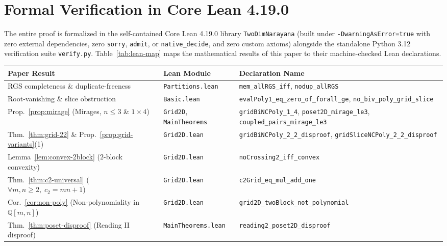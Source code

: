 \documentclass[11pt]{article}
\theoremstyle{plain}
\theoremstyle{definition}
\newcommand{\Q}{\mathbb{Q}}
\begin{document}
\section{Formal Verification in Core Lean 4.19.0}

The entire proof is formalized in the self-contained Core Lean 4.19.0 library \texttt{TwoDimNarayana} (built under \texttt{-DwarningAsError=true} with zero external dependencies, zero \texttt{sorry}, \texttt{admit}, or \texttt{native\_decide}, and zero custom axioms) alongside the standalone Python 3.12 verification suite \texttt{verify.py}. Table~\ref{tab:lean-map} maps the mathematical results of this paper to their machine-checked Lean declarations.

\begin{table}[ht]
\centering
\small
\begin{tabular}{@{}>{\raggedright\arraybackslash}p{}>{\raggedright\arraybackslash}p{}>{\raggedright\arraybackslash}p{}@{}}
\toprule
\textbf{Paper Result} & \textbf{Lean Module} & \textbf{Declaration Name} \\
\midrule
RGS completeness \& duplicate-freeness & \texttt{Partitions.lean} & \texttt{mem\_allRGS\_iff}, \texttt{nodup\_allRGS} \\
Root-vanishing \& slice obstruction & \texttt{Basic.lean} & \texttt{evalPoly1\_eq\_zero\_of\_forall\_ge}, \texttt{no\_biv\_poly\_grid\_slice} \\
Prop.~\ref{prop:mirage} (Mirages, $n \le 3$ \& $1 \times 4$) & \texttt{Grid2D}, \texttt{MainTheorems} & \texttt{gridBiNCPoly\_1\_4}, \texttt{poset2D\_mirage\_le3}, \texttt{coupled\_pairs\_mirage\_le3} \\
Thm.~\ref{thm:grid-22} \& Prop.~\ref{prop:grid-variants}(1) & \texttt{Grid2D.lean} & \texttt{gridBiNCPoly\_2\_2\_disproof}, \texttt{gridSliceNCPoly\_2\_2\_disproof} \\
Lemma~\ref{lem:convex-2block} ($2$-block convexity) & \texttt{Grid2D.lean} & \texttt{noCrossing2\_iff\_convex} \\
Thm.~\ref{thm:c2-universal} ($\forall m,n \ge 2,\; c_2 = mn+1$) & \texttt{Grid2D.lean} & \texttt{c2Grid\_eq\_mul\_add\_one} \\
Cor.~\ref{cor:non-poly} (Non-polynomiality in $\Q[m,n]$) & \texttt{Grid2D.lean} & \texttt{grid2D\_twoBlock\_not\_polynomial} \\
Thm.~\ref{thm:poset-disproof} (Reading II disproof) & \texttt{MainTheorems.lean} & \texttt{reading2\_poset2D\_disproof} \\

\end{tabular}
\end{table}
\end{document}
